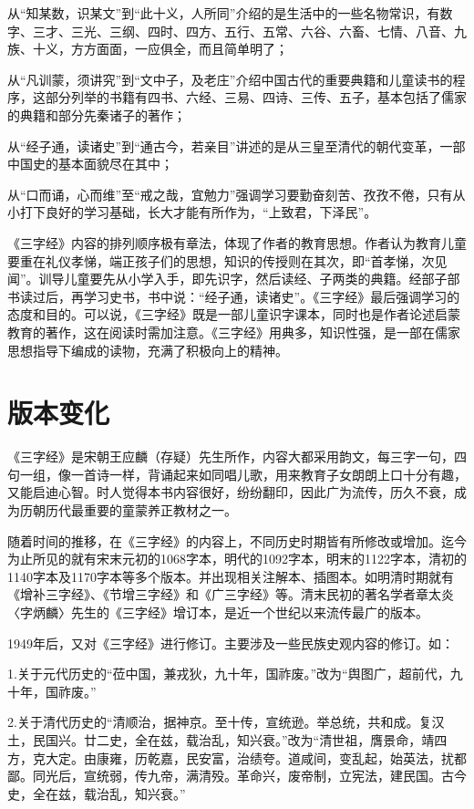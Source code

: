 \documentclass[a4paper,12pt,UTF8,twoside]{ctexbook}
\begin{document}
从“知某数，识某文”到“此十义，人所同”介绍的是生活中的一些名物常识，有数字、三才、三光、三纲、四时、四方、五行、五常、六谷、六畜、七情、八音、九族、十义，方方面面，一应俱全，而且简单明了；

从“凡训蒙，须讲究”到“文中子，及老庄”介绍中国古代的重要典籍和儿童读书的程序，这部分列举的书籍有四书、六经、三易、四诗、三传、五子，基本包括了儒家的典籍和部分先秦诸子的著作；

从“经子通，读诸史”到“通古今，若亲目”讲述的是从三皇至清代的朝代变革，一部中国史的基本面貌尽在其中；

从“口而诵，心而维”至“戒之哉，宜勉力”强调学习要勤奋刻苦、孜孜不倦，只有从小打下良好的学习基础，长大才能有所作为，“上致君，下泽民”。

《三字经》内容的排列顺序极有章法，体现了作者的教育思想。作者认为教育儿童要重在礼仪孝悌，端正孩子们的思想，知识的传授则在其次，即“首孝悌，次见闻”。训导儿童要先从小学入手，即先识字，然后读经、子两类的典籍。经部子部书读过后，再学习史书，书中说：“经子通，读诸史”。《三字经》最后强调学习的态度和目的。可以说，《三字经》既是一部儿童识字课本，同时也是作者论述启蒙教育的著作，这在阅读时需加注意。《三字经》用典多，知识性强，是一部在儒家思想指导下编成的读物，充满了积极向上的精神。

\chapter{版本变化}

《三字经》是宋朝王应麟（存疑）先生所作，内容大都采用韵文，每三字一句，四句一组，像一首诗一样，背诵起来如同唱儿歌，用来教育子女朗朗上口十分有趣，又能启迪心智。时人觉得本书内容很好，纷纷翻印，因此广为流传，历久不衰，成为历朝历代最重要的童蒙养正教材之一。

随着时间的推移，在《三字经》的内容上，不同历史时期皆有所修改或增加。迄今为止所见的就有宋末元初的1068字本，明代的1092字本，明末的1122字本，清初的1140字本及1170字本等多个版本。并出现相关注解本、插图本。如明清时期就有《增补三字经》、《节增三字经》和《广三字经》等。清末民初的著名学者章太炎〈字炳麟〉先生的《三字经》增订本，是近一个世纪以来流传最广的版本。

1949年后，又对《三字经》进行修订。主要涉及一些民族史观内容的修订。如：

1.关于元代历史的“莅中国，兼戎狄，九十年，国祚废。”改为“舆图广，超前代，九十年，国祚废。”

2.关于清代历史的“清顺治，据神京。至十传，宣统逊。举总统，共和成。复汉土，民国兴。廿二史，全在兹，载治乱，知兴衰。”改为“清世祖，膺景命，靖四方，克大定。由康雍，历乾嘉，民安富，治绩夸。道咸间，变乱起，始英法，扰都鄙。同光后，宣统弱，传九帝，满清殁。革命兴，废帝制，立宪法，建民国。古今史，全在兹，载治乱，知兴衰。”
\end{document}
